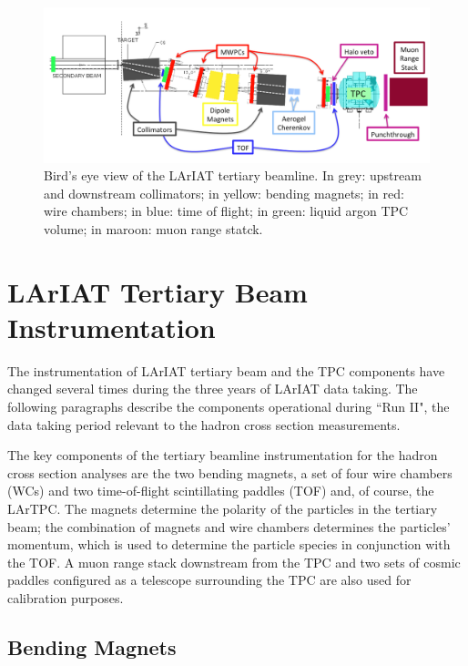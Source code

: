 \begin{figure}
  \centering  	
\includegraphics[width=\textwidth,height=\textheight,keepaspectratio]{Chapter-3/Images/Tertiary.png}
\caption{Bird's eye view of the LArIAT tertiary beamline. In grey: upstream and downstream collimators; in yellow: bending magnets; in red: wire chambers; in blue: time of flight; in green: liquid argon TPC volume; in maroon: muon range statck.}
\label{fig:tert-layout}
\end{figure}


\section{LArIAT Tertiary Beam Instrumentation}\label{sec:Instrumentation}

The instrumentation of  LArIAT tertiary beam and the TPC components have changed several times during the three years of LArIAT data taking. The following paragraphs describe the components operational during ``Run II", the data taking period relevant to the hadron cross section measurements.

The key components of the tertiary beamline instrumentation for the hadron cross section analyses are the two bending magnets, a set of four wire chambers (WCs) and two time-of-flight scintillating paddles (TOF) and, of course, the LArTPC.  The magnets determine the polarity of the particles in the tertiary beam; the combination of magnets and wire chambers determines the particles' momentum, which is used to determine the particle species in conjunction with the TOF.
A muon range stack downstream from the TPC and two sets of cosmic paddles configured as a telescope surrounding the TPC are also used for calibration purposes.


\subsection{Bending Magnets}\label{sec:Magnets}

